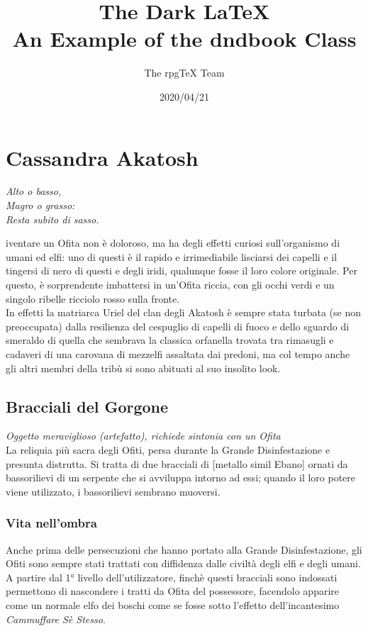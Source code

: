 \documentclass[letterpaper,twocolumn,openany,nodeprecatedcode]{dndbook}
\title{The Dark \LaTeX{} \\
\large An Example of the dndbook Class}
\author{The rpgTeX Team}
\date{2020/04/21}
\begin{document}
\chapter*{Cassandra Akatosh}

\begin{DndReadAloud}
  \it
  Alto o basso,\\
  Magro o grasso:\\
  Resta subito di sasso.\\
\end{DndReadAloud}

iventare un Ofita non è doloroso, ma ha degli effetti curiosi sull'organismo di umani ed elfi: uno di questi è il rapido e irrimediabile lisciarsi dei capelli e il tingersi di nero di questi e degli iridi, qualunque fosse il loro colore originale. Per questo, è sorprendente imbattersi in un'Ofita riccia, con gli occhi verdi e un singolo ribelle ricciolo rosso sulla fronte.\\
In effetti la matriarca Uriel del clan degli Akatosh è sempre stata turbata (se non preoccupata) dalla resilienza del cespuglio di capelli di fuoco e dello sguardo di smeraldo di quella che sembrava la classica orfanella trovata tra rimasugli e cadaveri di una carovana di mezzelfi assaltata dai predoni, ma col tempo anche gli altri membri della tribù si sono abituati al suo insolito look.\\

\section{Bracciali del Gorgone}
\textit{Oggetto meraviglioso (artefatto), richiede sintonia con un Ofita}\\
La reliquia più sacra degli Ofiti, persa durante la Grande Disinfestazione e presunta distrutta. Si tratta di due bracciali di [metallo simil Ebano] ornati da bassorilievi di un serpente che si avviluppa intorno ad essi; quando il loro potere viene utilizzato, i bassorilievi sembrano muoversi.

\subsection{Vita nell'ombra}
Anche prima delle persecuzioni che hanno portato alla Grande Disinfestazione, gli Ofiti sono sempre stati trattati con diffidenza dalle civiltà degli elfi e degli umani.\\
A partire dal 1° livello dell'utilizzatore, finchè questi bracciali sono indossati permettono di nascondere i tratti da Ofita del possessore, facendolo apparire come un normale elfo dei boschi come se fosse sotto l'effetto dell'incantesimo \textit{Cammuffare Sè Stesso}.
\end{document}
